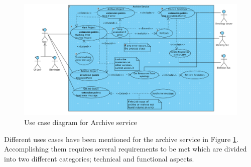  \begin{figure}[H]
    \centering \includegraphics[scale=0.6, angle=90, origin=c]{grafiken/archiveUseCase.png}
    \caption{Use case diagram for Archive service}
    \label{fig:archiveUseCase}
\end{figure}
 
Different uses cases have been mentioned for the archive service in Figure \ref{fig:archiveUseCase}. Accomplishing them requires several requirements to be met
which are divided into two different categories; technical and functional aspects. 


